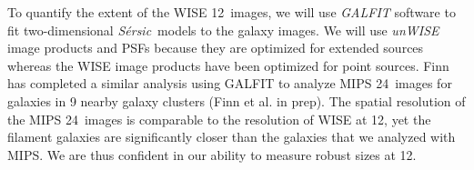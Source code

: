 \documentclass[11pt, preprint]{aastex}
\newcommand{\sers}{{\it S\'{e}rsic}}
\begin{document}
{%


To quantify the extent of the WISE 12\micron \ images, 
we will use  {\it GALFIT} software \citep{peng02}
to fit two-dimensional \sers \ models to the galaxy images.  We will use {\it unWISE} image products and PSFs \citep{lang14}
because they are optimized for extended sources whereas the WISE
image products have been optimized for point sources.
Finn has completed a similar analysis using GALFIT to analyze MIPS
24\micron \ images for galaxies in 9 nearby galaxy clusters (Finn et al. in prep).  The
spatial resolution of the MIPS 24\micron \ images is comparable to the
resolution of WISE at 12\micron, yet the filament galaxies are
significantly closer than the galaxies that we analyzed with MIPS.
We are thus confident in our ability to measure robust sizes at 12\micron.  






}
\end{document}
